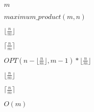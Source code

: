 \documentclass[10pt]{book}
\begin{document}
\begin{mdSnippets}
\begin{mdInlineSnippet}[6f8f57715090da2632453988d9a1501b]
$m$\end{mdInlineSnippet}%
\begin{mdInlineSnippet}[9bf2e284c766f982b9840d8dad3f7b9e]%
$maximum\_product(m,n)$\end{mdInlineSnippet}%
\begin{mdInlineSnippet}[62f2523728ef8163ea57dd81619f835f]%
$\lfloor \frac{n}{m} \rfloor$\end{mdInlineSnippet}%
\begin{mdInlineSnippet}[458359aa9a62348991c044bd28e46c95]%
$\lceil \frac{n}{m} \rceil$\end{mdInlineSnippet}%
\begin{mdInlineSnippet}[8fa86ac3a60ff0d9291bbbba49002e92]%
$OPT(n - \lfloor \frac{n}{m} \rfloor,m-1) * \lfloor \frac{n}{m} \rfloor$\end{mdInlineSnippet}%
\begin{mdInlineSnippet}[62f2523728ef8163ea57dd81619f835f]%
$\lfloor \frac{n}{m} \rfloor$\end{mdInlineSnippet}%
\begin{mdInlineSnippet}[458359aa9a62348991c044bd28e46c95]%
$\lceil \frac{n}{m} \rceil$\end{mdInlineSnippet}%
\begin{mdInlineSnippet}[0e2ae329177722b1818828e92b441032]%
$O(m)$\end{mdInlineSnippet}%

\end{mdSnippets}
\end{document}
